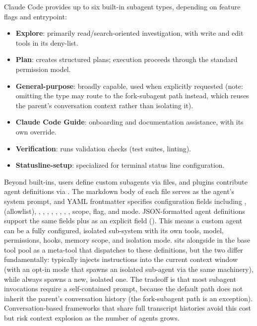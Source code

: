 Claude Code provides up to six built-in subagent types, depending on feature flags and entrypoint:

\begin{itemize}[nosep]
  \item \textbf{Explore}: primarily read/search-oriented investigation, with write and edit tools in its deny-list.
  \item \textbf{Plan}: creates structured plans; execution proceeds through the standard permission model.
  \item \textbf{General-purpose}: broadly capable, used when explicitly requested (note: omitting the type may route to the fork-subagent path instead, which reuses the parent's conversation context rather than isolating it).
  \item \textbf{Claude Code Guide}: onboarding and documentation assistance, with its own  override.
  \item \textbf{Verification}: runs validation checks (test suites, linting).
  \item \textbf{Statusline-setup}: specialized for terminal status line configuration.
\end{itemize}

Beyond built-ins, users define custom subagents via  files, and plugins contribute agent definitions via . The markdown body of each file serves as the agent's system prompt, and YAML frontmatter specifies configuration fields including ,  (allowlist), , , , , , , , ,  scope,  flag, and  mode. JSON-formatted agent definitions support the same fields plus  as an explicit field (). This means a custom agent can be a fully configured, isolated sub-system with its own tools, model, permissions, hooks, memory scope, and isolation mode.  sits alongside  in the base tool pool as a meta-tool that dispatches to these definitions, but the two differ fundamentally:  typically injects instructions into the current context window (with an opt-in  mode that spawns an isolated sub-agent via the same  machinery), while  always spawns a new, isolated one. The tradeoff is that most subagent invocations require a self-contained prompt, because the default path does not inherit the parent's conversation history (the fork-subagent path is an exception). Conversation-based frameworks that share full transcript histories avoid this cost but risk context explosion as the number of agents grows.

